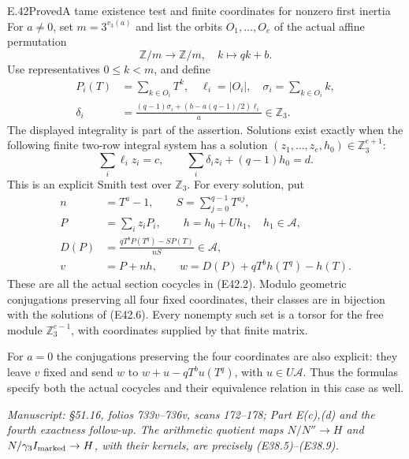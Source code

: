 \begin{statement}{E.42}{Proved}{A tame existence test and finite coordinates for nonzero first inertia}
For $a\ne0$, set $m=3^{v_3(a)}$ and list the orbits
$O_1,\ldots,O_e$ of the actual affine permutation
\[
 \mathbb Z/m\longrightarrow\mathbb Z/m,
                  \quad k\longmapsto qk+b.
 \tag{E42.4}
\]
Use representatives $0\le k<m$, and define
\[
 \begin{split}
 P_i(T)&=\sum_{k\in O_i}T^k,\quad
 \ell_i=|O_i|,\quad \sigma_i=\sum_{k\in O_i}k,\\
 \delta_i&=\frac{(q-1)\sigma_i+
                      (b-a(q-1)/2)\ell_i}{a}\in\mathbb Z_3.
 \end{split}
 \tag{E42.5}
\]
The displayed integrality is part of the assertion.
Solutions exist exactly when the following finite
two-row integral system has a solution
$(z_1,\ldots,z_e,h_0)\in\mathbb Z_3^{e+1}$:
\[
 \sum_i\ell_i z_i=c,\qquad
 \sum_i\delta_i z_i+(q-1)h_0=d.
 \tag{E42.6}
\]
This is an explicit Smith test over $\mathbb Z_3$.
For every solution, put
\[
 \begin{split}
 n&=T^a-1,\qquad S=\sum_{j=0}^{q-1}T^{aj},\\
 P&=\sum_i z_iP_i,\qquad h=h_0+U h_1,\quad h_1\in\mathscr A,\\
 D(P)&=\frac{qT^bP(T^q)-SP(T)}{nS}\in\mathscr A,\\
 v&=P+nh,\qquad
 w=D(P)+qT^bh(T^q)-h(T).
 \end{split}
 \tag{E42.7}
\]
These are all the actual section cocycles in (E42.2).
Modulo geometric conjugations preserving all four fixed
coordinates, their classes are in bijection with the
solutions of (E42.6). Every nonempty such set is a
torsor for the free module $\mathbb Z_3^{e-1}$, with
coordinates supplied by that finite matrix.

For $a=0$ the conjugations preserving the four coordinates
are also explicit: they leave $v$ fixed and send
$w$ to $w+u-qT^bu(T^q)$, with $u\in U\mathscr A$.
Thus the formulas specify both the actual cocycles and
their equivalence relation in this case as well.

\emph{Manuscript: \S51.16, folios 733v--736v, scans 172--178;
Part E(c),(d) and the fourth exactness follow-up. The
arithmetic quotient maps $N/N''\to H$ and
$N/\gamma_3I_{\rm marked}\to H$, with their kernels,
are precisely (E38.5)--(E38.9).}
\end{statement}
